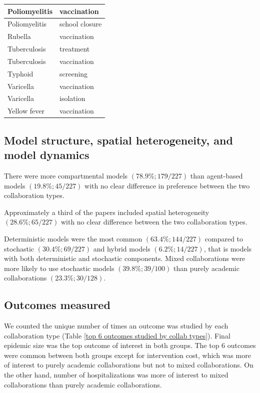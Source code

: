 \documentclass[10pt,letterpaper]{article}
\begin{document}
\begin{table}
\begin{tabular}{| l | l |}
			Poliomyelitis & vaccination \\ \hline
			Poliomyelitis & school closure \\ \hline
			Rubella & vaccination \\ \hline
			Tuberculosis & treatment \\ \hline
			Tuberculosis & vaccination \\ \hline
			Typhoid & screening \\ \hline
			Varicella & vaccination \\ \hline
			Varicella & isolation \\ \hline
			Yellow fever & vaccination \\ \hline
		\end{tabular}
			\label{top2_interventions_per_disease}
	\end{table} 

\subsection*{Model structure, spatial heterogeneity, and model dynamics}
There were more compartmental models $(78.9\%; 179/227)$ than agent-based models $(19.8\%; 45/227)$ with no clear difference in preference between the two collaboration types. 

Approximately a third of the papers included spatial heterogeneity $(28.6\%; 65/227)$ with no clear difference between the two collaboration types. 

Deterministic models were the most common $(63.4\%; 144/227)$ compared to stochastic $(30.4\%; 69/227)$ and hybrid models $(6.2\%; 14/227)$, that is models with both deterministic and stochastic components. Mixed collaborations were more likely to use stochastic models $(39.8\%; 39/100)$ than purely academic collaborations $(23.3\%; 30/128)$.

\subsection*{Outcomes measured}
We counted the unique number of times an outcome was studied by each collaboration type (Table \ref{top 6 outcomes studied by collab types}). Final epidemic size was the top outcome of interest in both groups. The top 6 outcomes were common between both groups except for intervention cost, which was more of interest to purely academic collaborations but not to mixed collaborations. On the other hand, number of hospitalizations was more of interest to mixed collaborations than purely academic collaborations. 
\end{document}
